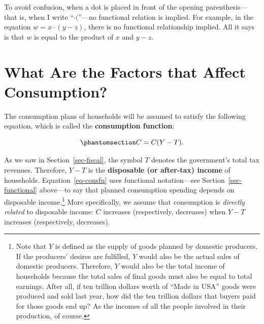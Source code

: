 \documentclass[
  letterpaper,
]{book}
\theoremstyle{plain}
\theoremstyle{remark}
\begin{document}
To avoid confusion, when a dot is placed in front of the opening
parenthesis---that is, when I write ``\(\cdot(\)''---no functional
relation is implied. For example, in the equation \(w=x\cdot(y-z)\),
there is no functional relationship implied. All it says is that \(w\)
is equal to the product of \(x\) and \(y - z\).

\section{What Are the Factors that Affect
Consumption?}\label{sec-consumption}

The consumption plans of households will be assumed to satisfy the
following equation, which is called the \textbf{consumption function}:

\begin{equation}\phantomsection\label{eq-consfn}{ 
C=C(Y-T).
}\end{equation}

As we saw in Section~\ref{sec-fiscal}, the symbol \(T\) denotes the
government's total tax revenues. Therefore, \(Y-T\)
is the \textbf{disposable (or after-tax) income}
 of households.
Equation~\ref{eq-consfn} uses functional notation---see
Section~\ref{sec-functional} above---to say that planned consumption
spending depends on disposable income.\footnote{Note that \(Y\) is
  defined as the supply of goods planned by domestic producers. If the
  producers' desires are fulfilled, \(Y\) would also be the actual sales
  of domestic producers. Therefore, \(Y\) would also be the total income
  of households because the total sales of final goods must also be
  equal to total earnings. After all, if ten trillion dollars worth of
  ``Made in USA'' goods were produced and sold last year, how did the
  ten trillion dollars that buyers paid for those goods end up? As the
  incomes of all the people involved in their production, of course.}
More specifically, we assume that consumption is \emph{directly related}
to disposable income: \(C\) increases (respectively, decreases) when
\(Y-T\) increases (respectively, decreases).
\end{document}
